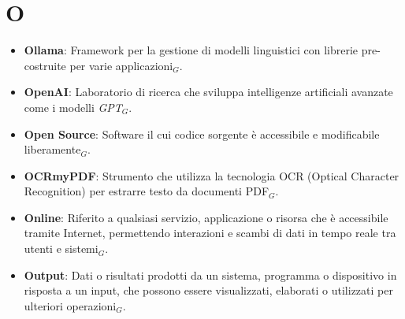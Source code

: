 \section{O}
\begin{itemize}
    \item \textbf{Ollama}: Framework per la gestione di modelli linguistici con librerie pre-costruite per varie applicazioni$_G$.
    \item \textbf{OpenAI}: Laboratorio di ricerca che sviluppa intelligenze artificiali avanzate come i modelli \textit{GPT}$_G$.
    \item \textbf{Open Source}: Software il cui codice sorgente è accessibile e modificabile liberamente$_G$.
    \item \textbf{OCRmyPDF}: Strumento che utilizza la tecnologia OCR (Optical Character Recognition) per estrarre testo da documenti PDF$_G$.
    \item \textbf{Online}: Riferito a qualsiasi servizio, applicazione o risorsa che è accessibile tramite Internet, permettendo interazioni e scambi di dati in tempo reale tra utenti e sistemi$_G$.
    \item \textbf{Output}: Dati o risultati prodotti da un sistema, programma o dispositivo in risposta a un input, che possono essere visualizzati, elaborati o utilizzati per ulteriori operazioni$_G$.
\end{itemize}
